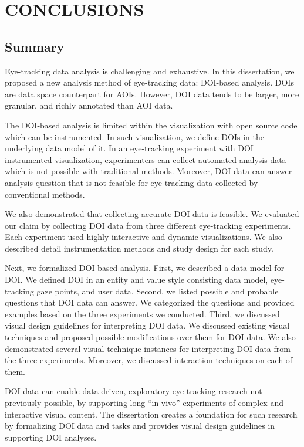 \chapter{CONCLUSIONS}
\label{chap:Conclusion}
\section{Summary}
Eye-tracking data analysis is challenging and exhaustive. In this dissertation, we proposed a new analysis method of eye-tracking data: DOI-based analysis. DOIs are data space counterpart for AOIs. However, DOI data tends to be larger, more granular, and richly annotated than AOI data. 

The DOI-based analysis is limited within the visualization with open source code which can be instrumented. In such visualization, we define DOIs in the underlying data model of it. In an eye-tracking experiment with DOI instrumented visualization, experimenters can collect automated analysis data which is not possible with traditional methods. Moreover, DOI data can answer analysis question that is not feasible for eye-tracking data collected by conventional methods. 

We also demonstrated that collecting accurate DOI data is feasible. We evaluated our claim by collecting DOI data from three different eye-tracking experiments. Each experiment used highly interactive and dynamic visualizations. We also described detail instrumentation methods and study design for each study.

Next, we formalized DOI-based analysis. First, we described a data model for DOI. We defined DOI in an entity and value style consisting data model, eye-tracking gaze points, and user data. Second, we listed possible and probable questions that DOI data can answer. We categorized the questions and provided examples based on the three experiments we conducted. Third, we discussed visual design guidelines for interpreting DOI data. We discussed existing visual techniques and proposed possible modifications over them for DOI data. We also demonstrated several visual technique instances for interpreting DOI data from the three experiments. Moreover, we discussed interaction techniques on each of them.

DOI data can enable data-driven, exploratory eye-tracking research not previously possible, by supporting long ``in vivo'' experiments of complex and interactive visual content. The dissertation creates a foundation for such research by formalizing DOI data and tasks and provides visual design guidelines in supporting DOI analyses.

